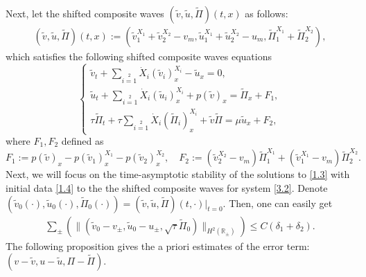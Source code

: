 \documentclass[10pt,reqno]{amsart}
\numberwithin{equation}{section}
\begin{document}
Next, let the shifted composite waves $(\widetilde{v}, \widetilde{u}, \widetilde{\Pi})(t, x)$ as follows:
\begin{align}\label{3.1}
\left(\widetilde{v}, \widetilde{u}, \widetilde{\Pi}\right)(t, x):=
\left(\widetilde{v}_1^{X_1}+\widetilde{v}_2^{X_2}-v_m,
\widetilde{u}_1^{X_1}+\widetilde{u}_2^{X_2}-u_m,
\widetilde{\Pi}_1^{X_1}+\widetilde{\Pi}_2^{X_2}\right),
\end{align}
which satisfies the following shifted composite waves equations
\begin{equation}\label{3.2}
\begin{cases}
\widetilde{v}_t+\sum\limits_{i=1}\limits^2\dot{X}_i(\widetilde{v}_i)^{X_i}_x-\widetilde{u}_x=0,\\
\widetilde{u}_t+\sum\limits_{i=1}\limits^2\dot{X}_i(\widetilde{u}_i)^{X_i}_x+p(\widetilde{v})_x
=\widetilde{\Pi}_x+F_1,\\
\tau\widetilde{\Pi}_t+\tau\sum\limits_{i=1}\limits^2\dot{X}_i(\widetilde{\Pi}_i)^{X_i}_x+\widetilde{v}\widetilde{\Pi}
=\mu\widetilde{u}_x+F_2,
\end{cases}
\end{equation}
where $F_1,F_2$ defined as
\begin{equation}\label{3.3}
F_1:=p(\widetilde{v})_x-p(\widetilde{v}_1)^{X_1}_x-p(\widetilde{v}_2)^{X_2}_x,\quad
F_2:=\left(\widetilde{v}^{X_2}_2-v_m\right)\widetilde{\Pi}_1^{X_1}
+\left(\widetilde{v}^{X_1}_1-v_m\right)\widetilde{\Pi}_2^{X_2}.
\end{equation}
Next, we will focus on the time-asymptotic stability of the solutions to \eqref{1.3} with initial data \eqref{1.4} to the the shifted composite waves for system \eqref{3.2}.
Denote $\left(\widetilde v_0( \cdot), \widetilde u_0( \cdot), \widetilde \Pi_0( \cdot)\right)=\left(\widetilde v, \widetilde u, \widetilde \Pi\right)(t, \cdot)\Big|_{t=0}$. Then,  one can easily get
\begin{align}\label{hu4.11}
\sum\limits_{\pm}\left(\|(\widetilde v_0-v_{\pm},\widetilde u_0-u_{\pm}, \sqrt{\tau}\widetilde \Pi_0)\|_{H^2(\mathbb{R}_{\pm})}\right)
\le C (\delta_1+\delta_2).
\end{align}
The following proposition gives the a priori estimates of the error term: $(v-\widetilde{v}, u-\widetilde{u}, \Pi-\widetilde{\Pi})$.
\end{document}
